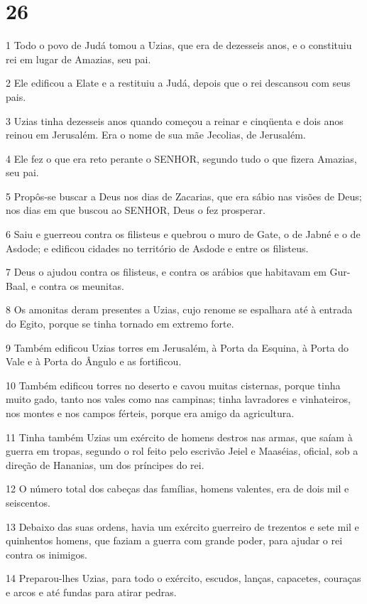 \chapter{26}

\par 1 Todo o povo de Judá tomou a Uzias, que era de dezesseis anos, e o constituiu rei em lugar de Amazias, seu pai.
\par 2 Ele edificou a Elate e a restituiu a Judá, depois que o rei descansou com seus pais.
\par 3 Uzias tinha dezesseis anos quando começou a reinar e cinqüenta e dois anos reinou em Jerusalém. Era o nome de sua mãe Jecolias, de Jerusalém.
\par 4 Ele fez o que era reto perante o SENHOR, segundo tudo o que fizera Amazias, seu pai.
\par 5 Propôs-se buscar a Deus nos dias de Zacarias, que era sábio nas visões de Deus; nos dias em que buscou ao SENHOR, Deus o fez prosperar.
\par 6 Saiu e guerreou contra os filisteus e quebrou o muro de Gate, o de Jabné e o de Asdode; e edificou cidades no território de Asdode e entre os filisteus.
\par 7 Deus o ajudou contra os filisteus, e contra os arábios que habitavam em Gur-Baal, e contra os meunitas.
\par 8 Os amonitas deram presentes a Uzias, cujo renome se espalhara até à entrada do Egito, porque se tinha tornado em extremo forte.
\par 9 Também edificou Uzias torres em Jerusalém, à Porta da Esquina, à Porta do Vale e à Porta do Ângulo e as fortificou.
\par 10 Também edificou torres no deserto e cavou muitas cisternas, porque tinha muito gado, tanto nos vales como nas campinas; tinha lavradores e vinhateiros, nos montes e nos campos férteis, porque era amigo da agricultura.
\par 11 Tinha também Uzias um exército de homens destros nas armas, que saíam à guerra em tropas, segundo o rol feito pelo escrivão Jeiel e Maaséias, oficial, sob a direção de Hananias, um dos príncipes do rei.
\par 12 O número total dos cabeças das famílias, homens valentes, era de dois mil e seiscentos.
\par 13 Debaixo das suas ordens, havia um exército guerreiro de trezentos e sete mil e quinhentos homens, que faziam a guerra com grande poder, para ajudar o rei contra os inimigos.
\par 14 Preparou-lhes Uzias, para todo o exército, escudos, lanças, capacetes, couraças e arcos e até fundas para atirar pedras.
